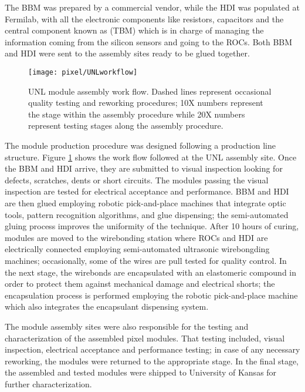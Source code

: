 The BBM was prepared by a commercial vendor, while the HDI was populated at Fermilab, with all the electronic components like resistors, capacitors and the central component known as  (TBM) which is in charge of managing the information coming from the silicon sensors and going to the ROCs. Both BBM and HDI were sent to the assembly sites ready to be glued together.  


\begin{figure}[!h]
  \centering
  \texttt{[image: pixel/UNLworkflow]}
  \caption[UNL module assembly work flow.]{UNL module assembly work flow. Dashed lines represent occasional quality testing and reworking procedures; 10X numbers represent the stage within the assembly procedure while 20X numbers represent testing stages along the assembly procedure.}\label{fig:unlworkflow}
\end{figure}


The module production procedure was designed following a production line structure. Figure \ref{fig:unlworkflow} shows the work flow followed at the UNL assembly site. Once the BBM and HDI arrive, they are
submitted to visual inspection looking for defects, scratches, dents or short circuits. The modules passing the visual inspection are tested for electrical acceptance and performance. BBM and HDI are then glued employing robotic pick-and-place machines that integrate optic tools, pattern recognition algorithms, and glue dispensing; the semi-automated gluing process improves the uniformity of the technique. After 10 hours of curing, modules are moved to the wirebonding station where ROCs and HDI are electrically connected employing semi-automated ultrasonic wirebongding machines; occasionally, some of the wires are pull tested for quality control. In the next stage, the wirebonds are encapsulated with an elastomeric compound in order to protect them against mechanical damage and electrical shorts; the encapsulation process is performed employing the robotic pick-and-place machine which also integrates the encapsulant dispensing system.

The module assembly sites were also responsible for the testing and characterization of the assembled pixel modules. That testing included, visual inspection, electrical acceptance and performance testing; in case of any necessary reworking, the modules were returned to the appropriate stage. In the final stage, the assembled and tested modules were shipped to University of Kansas for further characterization.  

